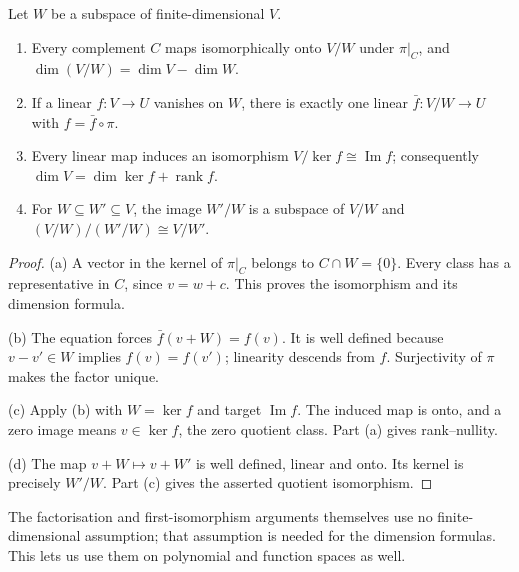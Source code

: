 \begin{theorem}[quotients]\label{linear:thm:quotient}
Let $W$ be a subspace of finite-dimensional $V$.
\begin{enumerate}[label=(\alph*)]
\item Every complement $C$ maps isomorphically onto $V/W$ under $\pi|_C$, and $\dim(V/W)=\dim V-\dim W$.
\item If a linear $f:V\to U$ vanishes on $W$, there is exactly one linear $\bar f:V/W\to U$ with $f=\bar f\circ\pi$.
\item Every linear map induces an isomorphism $V/\ker f\cong\operatorname{Im}f$; consequently $\dim V=\dim\ker f+\operatorname{rank}f$.
\item For $W\subseteq W'\subseteq V$, the image $W'/W$ is a subspace of $V/W$ and $(V/W)/(W'/W)\cong V/W'$.
\end{enumerate}
\end{theorem}
\begin{proof}
(a) A vector in the kernel of $\pi|_C$ belongs to $C\cap W=\{0\}$. Every class has a representative in $C$, since $v=w+c$. This proves the isomorphism and its dimension formula.

(b) The equation forces $\bar f(v+W)=f(v)$. It is well defined because $v-v'\in W$ implies $f(v)=f(v')$; linearity descends from $f$. Surjectivity of $\pi$ makes the factor unique.

(c) Apply (b) with $W=\ker f$ and target $\operatorname{Im}f$. The induced map is onto, and a zero image means $v\in\ker f$, the zero quotient class. Part (a) gives rank--nullity.

(d) The map $v+W\mapsto v+W'$ is well defined, linear and onto. Its kernel is precisely $W'/W$. Part (c) gives the asserted quotient isomorphism.
\end{proof}

The factorisation and first-isomorphism arguments themselves use no finite-dimensional assumption; that assumption is needed for the dimension formulas. This lets us use them on polynomial and function spaces as well.

